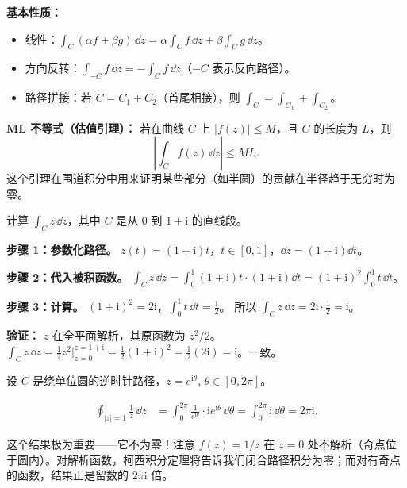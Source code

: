 \textbf{基本性质：}
\begin{itemize}
\item 线性：$\int_C (\alpha f + \beta g)\,\dd z = \alpha\int_C f\,\dd z + \beta\int_C g\,\dd z$。
\item 方向反转：$\int_{-C} f\,\dd z = -\int_C f\,\dd z$（$-C$ 表示反向路径）。
\item 路径拼接：若 $C = C_1 + C_2$（首尾相接），则 $\int_C = \int_{C_1} + \int_{C_2}$。
\end{itemize}

\textbf{ML 不等式（估值引理）：} 若在曲线 $C$ 上 $|f(z)| \leq M$，且 $C$ 的长度为 $L$，则
\begin{equation}
\left|\int_C f(z)\,\dd z\right| \leq M L.
\label{eq:ml_inequality}
\end{equation}
这个引理在围道积分中用来证明某些部分（如半圆）的贡献在半径趋于无穷时为零。

\begin{example}
计算 $\displaystyle\int_C z\,\dd z$，其中 $C$ 是从 $0$ 到 $1+\mathrm{i}$ 的直线段。

\textbf{步骤 1：参数化路径。}
$z(t) = (1+\mathrm{i})t$，$t\in[0,1]$，$\dd z = (1+\mathrm{i})\dd t$。

\textbf{步骤 2：代入被积函数。}
$\displaystyle\int_C z\,\dd z = \int_0^1 (1+\mathrm{i})t \cdot (1+\mathrm{i})\dd t
= (1+\mathrm{i})^2\int_0^1 t\,\dd t$。

\textbf{步骤 3：计算。}
$(1+\mathrm{i})^2 = 2\mathrm{i}$，$\int_0^1 t\,\dd t = \frac12$。
所以 $\int_C z\,\dd z = 2\mathrm{i} \cdot \frac12 = \mathrm{i}$。

\textbf{验证：} $z$ 在全平面解析，其原函数为 $z^2/2$。
$\int_C z\,\dd z = \frac12 z^2\big|_{z=0}^{z=1+\mathrm{i}} = \frac12(1+\mathrm{i})^2 = \frac12(2\mathrm{i}) = \mathrm{i}$。一致。
\end{example}

\begin{example}
设 $C$ 是绕单位圆的逆时针路径，$z = e^{\mathrm{i}\theta}$, $\theta\in[0,2\pi]$。

\begin{align*}
\oint_{|z|=1} \frac{1}{z}\,\dd z
&= \int_0^{2\pi} \frac{1}{e^{\mathrm{i}\theta}} \cdot \mathrm{i}e^{\mathrm{i}\theta}\,\dd\theta
= \int_0^{2\pi} \mathrm{i}\,\dd\theta = 2\pi\mathrm{i}.
\end{align*}

这个结果极为重要——它不为零！注意 $f(z)=1/z$ 在 $z=0$ 处不解析（奇点位于圆内）。对解析函数，柯西积分定理将告诉我们闭合路径积分为零；而对有奇点的函数，结果正是留数的 $2\pi\mathrm{i}$ 倍。
\end{example}

